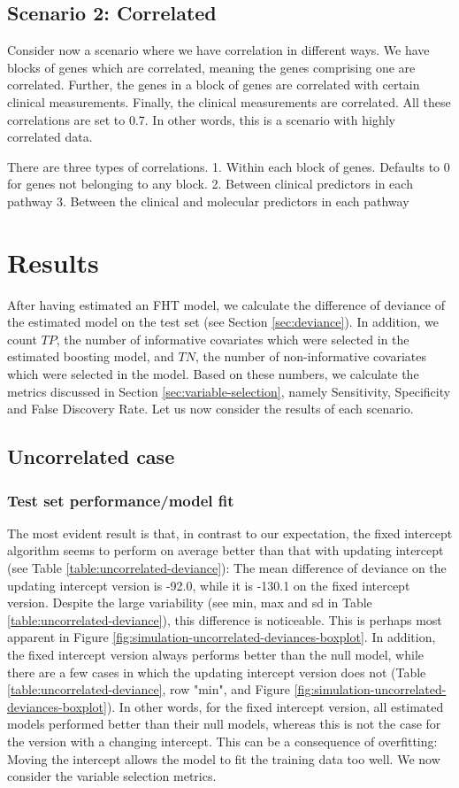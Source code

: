 \subsection{Scenario 2: Correlated}
Consider now a scenario where we have correlation in different ways.
We have blocks of genes which are correlated, meaning the genes comprising one are correlated.
Further, the genes in a block of genes are correlated with certain clinical measurements.
Finally, the clinical measurements are correlated.
All these correlations are set to 0.7.
In other words, this is a scenario with highly correlated data.

There are three types of correlations.
1. Within each block of genes. Defaults to 0 for genes not belonging to any block.
2. Between clinical predictors in each pathway
3. Between the clinical and molecular predictors in each pathway

\section{Results}
After having estimated an FHT model, we calculate the difference of deviance of the estimated model on the test set (see Section \ref{sec:deviance}).
In addition, we count $TP$, the number of informative covariates which were selected in the estimated boosting model, and $TN$, the number of non-informative covariates which were selected in the model.
Based on these numbers, we calculate the metrics discussed in Section \ref{sec:variable-selection}, namely Sensitivity, Specificity and False Discovery Rate.
Let us now consider the results of each scenario.

\subsection{Uncorrelated case}
\subsubsection{Test set performance/model fit}
The most evident result is that, in contrast to our expectation, the fixed intercept algorithm seems to perform on average better than that with updating intercept (see Table \ref{table:uncorrelated-deviance}):
The mean difference of deviance on the updating intercept version is -92.0, while it is -130.1 on the fixed intercept version.
Despite the large variability (see min, max and sd in Table \ref{table:uncorrelated-deviance}), this difference is noticeable.
This is perhaps most apparent in Figure \ref{fig:simulation-uncorrelated-deviances-boxplot}.
In addition, the fixed intercept version always performs better than the null model, while there are a few cases in which the updating intercept version does not (Table \ref{table:uncorrelated-deviance}, row "min", and Figure \ref{fig:simulation-uncorrelated-deviances-boxplot}).
In other words, for the fixed intercept version, all estimated models performed better than their null models, whereas this is not the case for the version with a changing intercept.
This can be a consequence of overfitting:
Moving the intercept allows the model to fit the training data too well.
We now consider the variable selection metrics.

